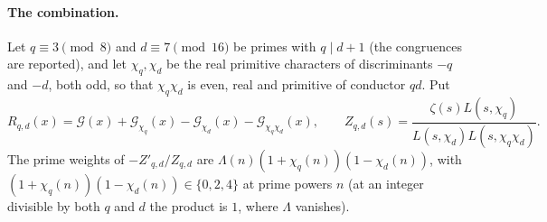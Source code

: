 \paragraph{The combination.} Let $q\equiv3\pmod 8$ and $d\equiv7\pmod{16}$ be primes with $q\mid d+1$ (the congruences are reported), and let $\chi_q,\chi_d$ be the real primitive characters of discriminants $-q$ and $-d$, both odd, so that $\chi_q\chi_d$ is even, real and primitive of conductor $qd$. Put
\begin{equation}\label{mq:eq:R}
R_{q,d}(x)=\mathcal G(x)+\mathcal G_{\chi_q}(x)-\mathcal G_{\chi_d}(x)-\mathcal G_{\chi_q\chi_d}(x),\qquad Z_{q,d}(s)=\frac{\zeta(s)L(s,\chi_q)}{L(s,\chi_d)L(s,\chi_q\chi_d)} .
\end{equation}
The prime weights of $-Z'_{q,d}/Z_{q,d}$ are $\Lambda(n)(1+\chi_q(n))(1-\chi_d(n))$, with $(1+\chi_q(n))(1-\chi_d(n))\in\{0,2,4\}$ at prime powers $n$ (at an integer divisible by both $q$ and $d$ the product is $1$, where $\Lambda$ vanishes).

